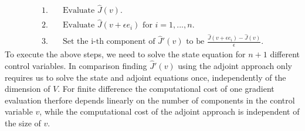 \begin{align*}
1.\quad & \textrm{Evaluate $\hat J(v)$.}\\
2.\quad & \textrm{Evaluate $\hat J(v+\epsilon e_i)$ for $i=1,...,n$. }\\
3.\quad & \textrm{Set the i-th component of $\hat J'(v)$ to be $\frac{\hat J(v+\epsilon e_i)-\hat J(v)}{\epsilon}$.}
\end{align*}
To execute the above steps, we need to solve the state equation for $n+1$ different control variables. In comparison finding $\hat J'(v)$ using the adjoint approach only requires us to solve the state and adjoint equations once, independently of the dimension of $V$. For finite difference the computational cost of one gradient evaluation therfore depends linearly on the number of components in the control variable $v$, while the computational cost of the adjoint approach is independent of the size of $v$.
